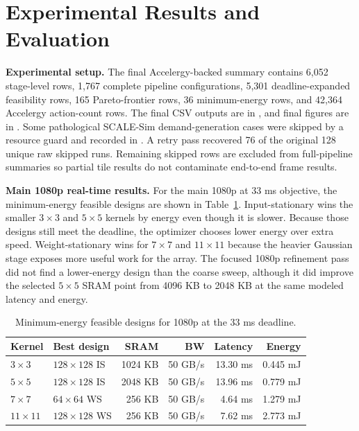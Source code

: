 \documentclass[12pt]{article}
\begin{document}
\section{Experimental Results and Evaluation}

\textbf{Experimental setup.} The final Accelergy-backed summary contains 6,052 stage-level rows, 1,767 complete pipeline configurations, 5,301 deadline-expanded feasibility rows, 165 Pareto-frontier rows, 36 minimum-energy rows, and 42,364 Accelergy action-count rows. The final CSV outputs are in , and final figures are in . Some pathological SCALE-Sim demand-generation cases were skipped by a resource guard and recorded in . A retry pass recovered 76 of the original 128 unique raw skipped runs. Remaining skipped rows are excluded from full-pipeline summaries so partial tile results do not contaminate end-to-end frame results.

\textbf{Main 1080p real-time results.} For the main 1080p at 33 ms objective, the minimum-energy feasible designs are shown in Table~\ref{tab:1080p}. Input-stationary wins the smaller $3\times3$ and $5\times5$ kernels by energy even though it is slower. Because those designs still meet the deadline, the optimizer chooses lower energy over extra speed. Weight-stationary wins for $7\times7$ and $11\times11$ because the heavier Gaussian stage exposes more useful work for the array. The focused 1080p refinement pass did not find a lower-energy design than the coarse sweep, although it did improve the selected $5\times5$ SRAM point from 4096 KB to 2048 KB at the same modeled latency and energy.

\begin{table}[H]
\centering
\small
\caption{Minimum-energy feasible designs for 1080p at the 33 ms deadline.}
\label{tab:1080p}
\begin{tabular}{l l r r r r}
\toprule
Kernel & Best design & SRAM & BW & Latency & Energy \\
\midrule
$3\times3$ & $128\times128$ IS & 1024 KB & 50 GB/s & 13.30 ms & 0.445 mJ \\
$5\times5$ & $128\times128$ IS & 2048 KB & 50 GB/s & 13.96 ms & 0.779 mJ \\
$7\times7$ & $64\times64$ WS & 256 KB & 50 GB/s & 4.64 ms & 1.279 mJ \\
$11\times11$ & $128\times128$ WS & 256 KB & 50 GB/s & 7.62 ms & 2.773 mJ \\
\bottomrule
\end{tabular}
\end{table}
\end{document}
